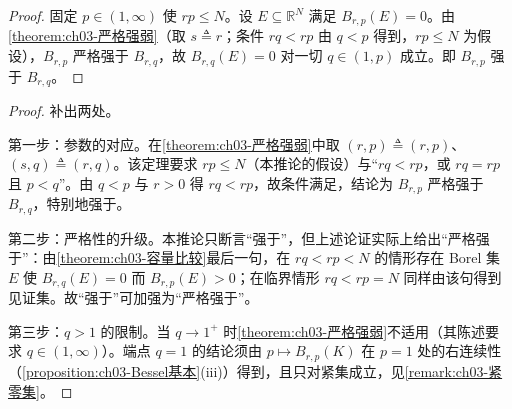 \documentclass[../../main.tex]{subfiles}%
\begin{document}
\begin{proof}
固定 $p\in(1,\infty)$ 使 $rp\leqslant N$。设 $E\subseteq\mathbb{R}^N$ 满足 $B_{r,p}(E)=0$。由\cref{theorem:ch03-严格强弱}（取 $s\triangleq r$；条件 $rq<rp$ 由 $q<p$ 得到，$rp\leqslant N$ 为假设），$B_{r,p}$ 严格强于 $B_{r,q}$，故 $B_{r,q}(E)=0$ 对一切 $q\in(1,p)$ 成立。即 $B_{r,p}$ 强于 $B_{r,q}$。
\end{proof}

\begin{proof}
补出两处。

第一步：参数的对应。在\cref{theorem:ch03-严格强弱}中取 $(r,p)\triangleq(r,p)$、$(s,q)\triangleq(r,q)$。该定理要求 $rp\leqslant N$（本推论的假设）与“$rq<rp$，或 $rq=rp$ 且 $p<q$”。由 $q<p$ 与 $r>0$ 得 $rq<rp$，故条件满足，结论为 $B_{r,p}$ 严格强于 $B_{r,q}$，特别地强于。

第二步：严格性的升级。本推论只断言“强于”，但上述论证实际上给出“严格强于”：由\cref{theorem:ch03-容量比较}最后一句，在 $rq<rp<N$ 的情形存在 Borel 集 $E$ 使 $B_{r,q}(E)=0$ 而 $B_{r,p}(E)>0$；在临界情形 $rq<rp=N$ 同样由该句得到见证集。故“强于”可加强为“严格强于”。

第三步：$q>1$ 的限制。当 $q\to1^+$ 时\cref{theorem:ch03-严格强弱}不适用（其陈述要求 $q\in(1,\infty)$）。端点 $q=1$ 的结论须由 $p\mapsto B_{r,p}(K)$ 在 $p=1$ 处的右连续性（\cref{proposition:ch03-Bessel基本}(iii)）得到，且只对紧集成立，见\cref{remark:ch03-紧零集}。
\end{proof}
\end{document}
